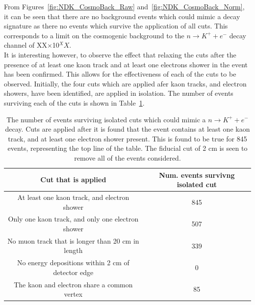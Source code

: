From Figures~\ref{fig:NDK_CosmoBack_Raw} and~\ref{fig:NDK_CosmoBack_Norm}, it can be seen that there are no background events which could mimic a decay signature as there no events which survive the application of all cuts. This corresponds to a limit on the cosmogenic background to the $n \rightarrow K^{+} + e^{-}$ decay channel of XX$\times$10$^XX$. \\

It is interesting however, to observe the effect that relaxing the cuts after the presence of at least one kaon track and at least one electrons shower in the event has been confirmed. This allows for the effectiveness of each of the cuts to be observed. Initially, the four cuts which are applied afer kaon tracks, and electron showers, have been identified, are applied in isolation. The number of events surviving each of the cuts is shown in Table~\ref{tab:NDK_CosmoBack_EachCut}. \\

\begin{table}[h!]
  \caption[The number of events surviving isolated cuts which could mimic a $n \rightarrow K^{+} + e^{-}$ decay]
          {The number of events surviving isolated cuts which could mimic a $n \rightarrow K^{+} + e^{-}$ decay. Cuts are applied after it is found that the event contains at least one kaon track, and at least one electron shower present. This is found to be true for 845 events, representing the top line of the table. The fiducial cut of 2 cm is seen to remove all of the events considered.}
  \centering
  \label{tab:NDK_CosmoBack_EachCut}
  \begin{tabular}{c c}
    \toprule
        {Cut that is applied}                                & {Num. events survivng isolated cut} \\
        \midrule
        At least one kaon track, and electron shower         & 845                                 \\

        Only one kaon track, and only one electron shower    & 507                                 \\

        No muon track that is longer than 20 cm in length    & 339                                 \\

        No energy depositions within 2 cm of detector edge   & 0                                   \\

        The kaon and electron share a common vertex          & 85                                  \\
        \bottomrule
  \end{tabular}
\end{table}

